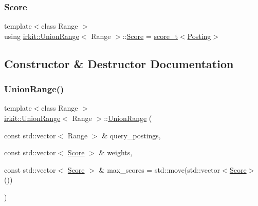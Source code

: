 \mbox{\label{classirkit_1_1UnionRange_a47fb098a85581f5e33f4203e16245dae}} 
\subsubsection{\texorpdfstring{Score}{Score}}
{\footnotesize\ttfamily template$<$class Range $>$ \\
using \mbox{\hyperlink{classirkit_1_1UnionRange}{irkit\+::\+Union\+Range}}$<$ Range $>$\+::\mbox{\hyperlink{classirkit_1_1UnionRange_a47fb098a85581f5e33f4203e16245dae}{Score}} =  \mbox{\hyperlink{namespaceirkit_a754dabe3346f950c948e7596d9d46c71}{score\+\_\+t}}$<$\mbox{\hyperlink{classirkit_1_1UnionRange_a5f694970419f5a60d7fd41d740556229}{Posting}}$>$\hspace{0.3cm}{\ttfamily [protected]}}



\subsection{Constructor \& Destructor Documentation}
\mbox{\label{classirkit_1_1UnionRange_a23072335eaa144321314fbbdd39e9423}} 
\subsubsection{\texorpdfstring{Union\+Range()}{UnionRange()}}
{\footnotesize\ttfamily template$<$class Range $>$ \\
\mbox{\hyperlink{classirkit_1_1UnionRange}{irkit\+::\+Union\+Range}}$<$ Range $>$\+::\mbox{\hyperlink{classirkit_1_1UnionRange}{Union\+Range}} (\begin{DoxyParamCaption}\item[{const std\+::vector$<$ Range $>$ \&}]{query\+\_\+postings,  }\item[{const std\+::vector$<$ \mbox{\hyperlink{classirkit_1_1UnionRange_a47fb098a85581f5e33f4203e16245dae}{Score}} $>$ \&}]{weights,  }\item[{const std\+::vector$<$ \mbox{\hyperlink{classirkit_1_1UnionRange_a47fb098a85581f5e33f4203e16245dae}{Score}} $>$ \&}]{max\+\_\+scores = {\ttfamily std\+:\+:move(std\+:\+:vector$<$\mbox{\hyperlink{classirkit_1_1UnionRange_a47fb098a85581f5e33f4203e16245dae}{Score}}$>$())} }\end{DoxyParamCaption})\hspace{0.3cm}{\ttfamily [inline]}}



